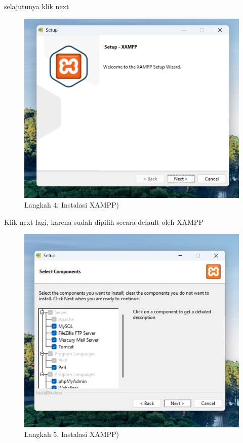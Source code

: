 \documentclass[
]{book}
\begin{document}
selajutunya klik next

\begin{figure}

{\centering \includegraphics[width=1\linewidth]{./images/Bab1/xampp3} 

}

\caption{Langkah 4: Instalasi XAMPP)}\label{fig:install-xammp3}
\end{figure}

Klik next lagi, karena sudah dipilih secara default oleh XAMPP

\begin{figure}

{\centering \includegraphics[width=1\linewidth]{./images/Bab1/xampp4} 

}

\caption{Langkah 5, Instalasi XAMPP)}\label{fig:install-xammp4}
\end{figure}
\end{document}
